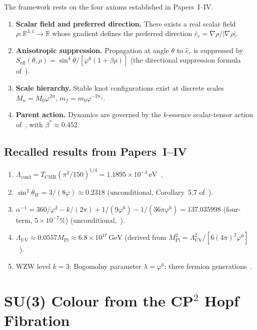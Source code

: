\documentclass[11pt,a4paper]{article}
\theoremstyle{definition}
\theoremstyle{remark}
\newcommand{\vp}{\varphi}
\newcommand{\bst}{\beta^{*}}
\newcommand{\lam}{\lambda}
\newcommand{\TCMB}{T_{\mathrm{CMB}}}
\newcommand{\Lcond}{\Lambda_{\mathrm{cond}}}
\newcommand{\sinW}{\sin^{2}\!\theta_{W}}
\newcommand{\MPl}{M_{\mathrm{Pl}}}
\newcommand{\LUV}{\Lambda_{\mathrm{UV}}}
\begin{document}
The framework rests on the four axioms established in Papers~I--IV.

\begin{enumerate}[label=\textbf{A\arabic*.},leftmargin=*]
\item \textbf{Scalar field and preferred direction.}
  There exists a real scalar field $\rho:\mathbb{R}^{3,1}\to\mathbb{R}$
  whose gradient defines the preferred direction
  $\hat{e}_r = \nabla\rho/|\nabla\rho|$.
\item \textbf{Anisotropic suppression.}
  Propagation at angle $\theta$ to $\hat{e}_r$ is suppressed by
  $S_{\mathrm{eff}}(\theta,\rho) = \sin^4\!\theta/[\vp^6(1+\beta\rho)]$
  (the directional suppression formula of~\cite{Paper1}).
\item \textbf{Scale hierarchy.}
  Stable knot configurations exist at discrete scales
  $M_n = M_0\vp^{2n}$, $m_f = m_0\vp^{-2n_f}$.
\item \textbf{Parent action.}
  Dynamics are governed by the $k$-essence scalar-tensor action
  of~\cite{Paper1}, with $\bst\approx0.452$.
\end{enumerate}

\subsection{Recalled results from Papers~I--IV}

\begin{enumerate}[label=\textbf{R\arabic*.},leftmargin=*]
\item $\Lcond = \TCMB(\pi^2/150)^{1/4} = 1.1895\times10^{-4}\,\mathrm{eV}$~\cite{Paper4}.
\item $\sinW = 3/(8\vp) \approx 0.2318$ (unconditional,
  Corollary~5.7 of~\cite{Paper1}).
\item $\alpha^{-1} = 360/\vp^2 - k/(2\pi) + 1/(9\vp^6) - 1/(36\pi\vp^6) = 137.035998$ (four-term, $5\times10^{-7}\%$) (unconditional,~\cite{Paper4}).
\item $\LUV \approx 0.0557\MPl \approx 6.8\times10^{17}\,\mathrm{GeV}$
  (derived from $\MPl^2 = \LUV^2/[6(4\pi)^2\vp^6]$~\cite{Paper1}).
\item WZW level $k=3$; Bogomolny parameter $\lam=\vp^6$; three
  fermion generations~\cite{Paper1,Paper4}.
\end{enumerate}

\section{SU(3) Colour from the CP$^2$ Hopf Fibration}
\label{P5:sec:su3}
\end{document}
